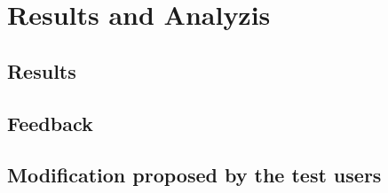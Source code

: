 
\chapter{Results and Analyzis} %

\label{Chapter6} %



\section{Results}




\section{Feedback}



\section{Modification proposed by the test users}